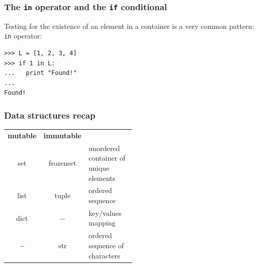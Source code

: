 \documentclass[english,serif,mathserif,xcolor=pdftex,dvipsnames,table]{beamer}
\begin{document}
\begin{frame}
  \frametitle{The \texttt{in} operator and the \texttt{if} conditional
  }

  Testing for the existence of an element in a container is a very
  common pattern:
  \texttt{in} operator:

\begin{lstlisting}
>>> L = [1, 2, 3, 4]
>>> if 1 in L:
...   print "Found!"
...
Found!
\end{lstlisting}

\end{frame}



\begin{frame}
  \frametitle{Data structures recap}
  \begin{center}
    \begin{tabular}{>{\ttfamily}c|>{\ttfamily}c|>{\footnotesize}p{0.5\linewidth}}
      \rmfamily \textbf{mutable} & \rmfamily \textbf{immutable} & \\
      set & frozenset & unordered container of
      unique elements\\[1ex]
      list & tuple & ordered sequence\\[1ex]
      dict & $-$ & key/values mapping\\[1ex]
      $-$& str & ordered sequence of characters\\
    \end{tabular}
  \end{center}
\end{frame}







\end{document}

